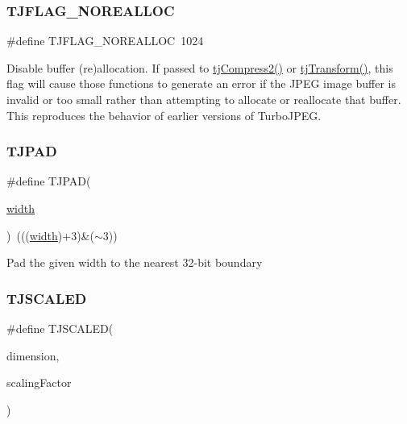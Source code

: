 \mbox{\label{group___turbo_j_p_e_g_ga8808d403c68b62aaa58a4c1e58e98963}} 
\subsubsection{\texorpdfstring{T\+J\+F\+L\+A\+G\+\_\+\+N\+O\+R\+E\+A\+L\+L\+OC}{TJFLAG\_NOREALLOC}}
{\footnotesize\ttfamily \#define T\+J\+F\+L\+A\+G\+\_\+\+N\+O\+R\+E\+A\+L\+L\+OC~1024}

Disable buffer (re)allocation. If passed to \hyperlink{group___turbo_j_p_e_g_gaba62b7a98f960839b588579898495cf2}{tj\+Compress2()} or \hyperlink{group___turbo_j_p_e_g_gae403193ceb4aafb7e0f56ab587b48616}{tj\+Transform()}, this flag will cause those functions to generate an error if the J\+P\+EG image buffer is invalid or too small rather than attempting to allocate or reallocate that buffer. This reproduces the behavior of earlier versions of Turbo\+J\+P\+EG. \mbox{\label{group___turbo_j_p_e_g_ga0aba955473315e405295d978f0c16511}} 
\subsubsection{\texorpdfstring{T\+J\+P\+AD}{TJPAD}}
{\footnotesize\ttfamily \#define T\+J\+P\+AD(\begin{DoxyParamCaption}\item[{}]{\hyperlink{png_8h_ad46179dbe9c68fdcea52b34c3480ec0f}{width} }\end{DoxyParamCaption})~(((\hyperlink{png_8h_ad46179dbe9c68fdcea52b34c3480ec0f}{width})+3)\&($\sim$3))}

Pad the given width to the nearest 32-\/bit boundary \mbox{\label{group___turbo_j_p_e_g_ga84878bb65404204743aa18cac02781df}} 
\subsubsection{\texorpdfstring{T\+J\+S\+C\+A\+L\+ED}{TJSCALED}}
{\footnotesize\ttfamily \#define T\+J\+S\+C\+A\+L\+ED(\begin{DoxyParamCaption}\item[{}]{dimension,  }\item[{}]{scaling\+Factor }\end{DoxyParamCaption})}

